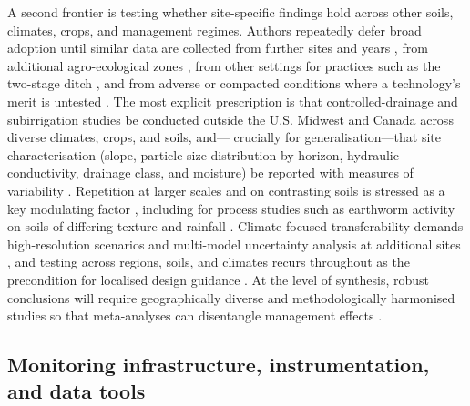 A second frontier is testing whether site-specific findings hold across
other soils, climates, crops, and management regimes. Authors repeatedly
defer broad adoption until similar data are collected from further sites and
years \parencite{Menegaz2025,Zimmerman2017b,Terrado2015}, from additional
agro-ecological zones \parencite{Ali2001}, from other settings for
practices such as the two-stage ditch \parencite{Hodaj2017}, and from
adverse or compacted conditions where a technology's merit is untested
\parencite{Bigelow2001}. The most explicit prescription is that
controlled-drainage and subirrigation studies be conducted outside the U.S.
Midwest and Canada across diverse climates, crops, and soils, and---
crucially for generalisation---that site characterisation (slope,
particle-size distribution by horizon, hydraulic conductivity, drainage
class, and moisture) be reported with measures of variability
\parencite{Singh2022b}. Repetition at larger scales and on contrasting soils
is stressed as a key modulating factor
\parencite{Bilotta2008,Goeken2015}, including for process studies such as
earthworm activity on soils of differing texture and rainfall
\parencite{Nuutinen2001,Nuutinen2011}. Climate-focused transferability
demands high-resolution scenarios and multi-model uncertainty analysis at
additional sites \parencite{Rasmussen2018,Jeantet2022,Jin2008}, and testing
across regions, soils, and climates recurs throughout as the precondition
for localised design guidance
\parencite{Singh2020b,Malota2024,Salazar2008,Holbak2021}. At the level of
synthesis, robust conclusions will require geographically diverse and
methodologically harmonised studies so that meta-analyses can disentangle
management effects \parencite{Wu2025}.

\subsection{Monitoring infrastructure, instrumentation, and data tools}


